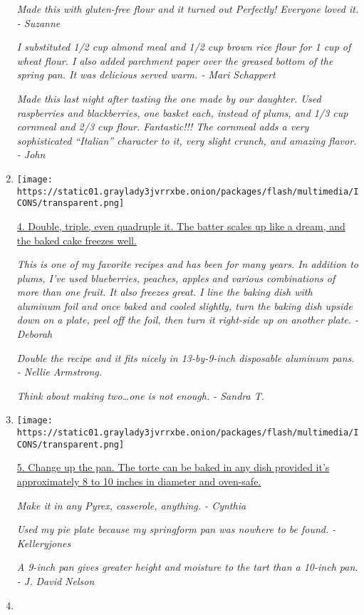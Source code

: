 \begin{enumerate}
  \emph{Made this with gluten-free flour and it turned out Perfectly!
  Everyone loved it. - Suzanne}

  \emph{I substituted 1/2 cup almond meal and 1/2 cup brown rice flour
  for 1 cup of wheat flour. I also added parchment paper over the
  greased bottom of the spring pan. It was delicious served warm. - Mari
  Schappert}

  \emph{Made this last night after tasting the one made by our daughter.
  Used raspberries and blackberries, one basket each, instead of plums,
  and 1/3 cup cornmeal and 2/3 cup flour. Fantastic!!! The cornmeal adds
  a very sophisticated ``Italian'' character to it, very slight crunch,
  and amazing flavor. - John}
\item
  \texttt{[image: https://static01.graylady3jvrrxbe.onion/packages/flash/multimedia/ICONS/transparent.png]}

  \href{http://www.nytimes3xbfgragh.onion/2016/09/14/dining/marian-burros-plum-torte-recipe.html}{4.
  Double, triple, even quadruple it. The batter scales up like a dream,
  and the baked cake freezes well.}

  \emph{This is one of my favorite recipes and has been for many years.
  In addition to plums, I've used blueberries, peaches, apples and
  various combinations of more than one fruit. It also freezes great. I
  line the baking dish with aluminum foil and once baked and cooled
  slightly, turn the baking dish upside down on a plate, peel off the
  foil, then turn it right-side up on another plate. - Deborah}

  \emph{Double the recipe and it fits nicely in 13-by-9-inch disposable
  aluminum pans. - Nellie Armstrong.}

  \emph{Think about making two\ldots{}one is not enough. - Sandra T.}
\item
  \texttt{[image: https://static01.graylady3jvrrxbe.onion/packages/flash/multimedia/ICONS/transparent.png]}

  \href{http://www.nytimes3xbfgragh.onion/2016/09/14/dining/marian-burros-plum-torte-recipe.html}{5.
  Change up the pan. The torte can be baked in any dish provided it's
  approximately 8 to 10 inches in diameter and oven-safe.}

  \emph{Make it in any Pyrex, casserole, anything. - Cynthia}

  \emph{Used my pie plate because my springform pan was nowhere to be
  found. - Kelleryjones}

  \emph{A 9-inch pan gives greater height and moisture to the tart than
  a 10-inch pan. - J. David Nelson}
\item
\end{enumerate}

